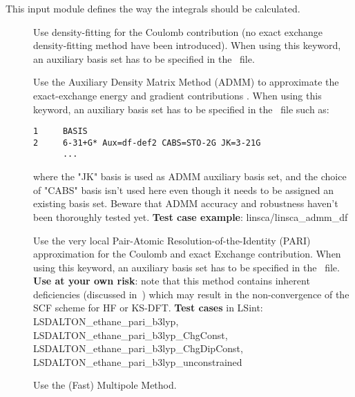 This input module defines the way the integrals should be calculated.
\begin{description}

\item[] Use density-fitting for the Coulomb contribution (no exact exchange density-fitting method have been introduced). 
When using this keyword, an auxiliary basis set has to be 
specified in the \mol\ file.

\item[] Use the Auxiliary Density Matrix Method (ADMM) to approximate 
the exact-exchange energy and gradient contributions \cite{ADMM:2010}.
When using this keyword, an auxiliary basis set has to be 
specified in the \mol\ file such as:
\begin{verbatim}
1     BASIS
2     6-31+G* Aux=df-def2 CABS=STO-2G JK=3-21G
      ...
\end{verbatim} 
where the "JK" basis is used as ADMM auxiliary basis set, and the choice of "CABS" basis isn't used here even though it needs to be assigned an existing basis set.
Beware that ADMM accuracy and robustness haven't been thoroughly tested yet.\newline
{\bf Test case example}: linsca/linsca\_admm\_df

\item[] Use the very local Pair-Atomic Resolution-of-the-Identity (PARI) 
approximation \cite{PARI:2013} for the Coulomb and exact Exchange contribution.
When using this keyword, an auxiliary basis set has to be 
specified in the \mol\ file.\newline
{\bf Use at your own risk}: note that this method contains inherent deficiencies (discussed in~\cite{PARI:2013}) 
which may result in the non-convergence of the SCF scheme for HF or KS-DFT. \newline
{\bf Test cases} in LSint: LSDALTON\_ethane\_pari\_b3lyp, 
LSDALTON\_ethane\_pari\_b3lyp\_ChgConst, 
LSDALTON\_ethane\_pari\_b3lyp\_ChgDipConst, 
LSDALTON\_ethane\_pari\_b3lyp\_unconstrained


\item[] Use the (Fast) Multipole Method.


\end{description}
